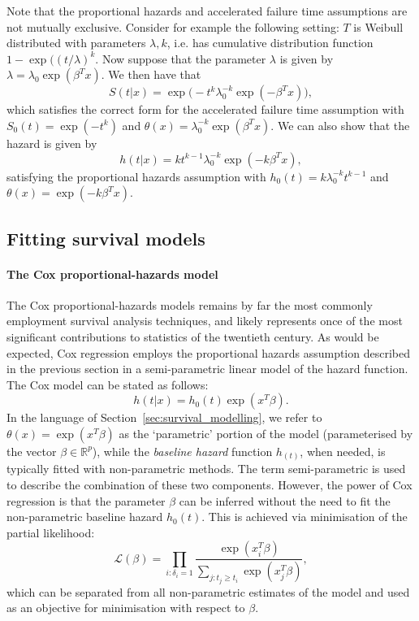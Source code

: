\documentclass[../thesis.tex]{subfiles}
\begin{document}
Note that the proportional hazards and accelerated failure time assumptions are not mutually exclusive. Consider for example the following setting: $T$ is Weibull distributed with parameters $\lambda, k$, i.e. has cumulative distribution function $1- \exp((t/\lambda)^k$. Now suppose that the parameter $\lambda$ is given by $\lambda = \lambda_0 \exp(\beta^T x)$. We then have that 
\[S(t|x) = \exp\big(-t^k\lambda_0^{-k}\exp( -\beta^Tx)\big), \]
which satisfies the correct form for the accelerated failure time assumption with $S_0(t) = \exp(-t^k)$ and $\theta(x) = \lambda_0^{-k}\exp(\beta^Tx)$. We can also show that the hazard is given by 
\[h(t|x) = kt^{k-1}\lambda_0^{-k} \exp(-k\beta^Tx), \]
satisfying the proportional hazards assumption with $h_0(t) = k\lambda_0^{-k}t^{k-1}$ and $\theta(x) = \exp(-k\beta^Tx)$. 



\subsection{Fitting survival models}

\paragraph{The Cox proportional-hazards model}
The Cox proportional-hazards models \citep{cox_regression_1972} remains by far the most commonly employment survival analysis techniques, and likely represents once of the most significant contributions to statistics of the twentieth century. As would be expected, Cox regression employs the proportional hazards assumption described in the previous section in a semi-parametric linear model of the hazard function. The Cox model can be stated as follows:
\[h(t|x) = h_0(t) \exp(x^T\beta). \]
In the language of Section~\ref{sec:survival_modelling}, we refer to $\theta(x) = \exp(x^T\beta)$ as the `parametric' portion of the model (parameterised by the vector $\beta \in \mathbb{R}^p$), while the \emph{baseline hazard} function $h_(t)$, when needed, is typically fitted with non-parametric methods. The term semi-parametric is used to describe the combination of these two components. However, the power of Cox regression is that the parameter $\beta$ can be inferred without the need to fit the non-parametric baseline hazard $h_0(t)$. This is achieved via minimisation of the partial likelihood:
\[\mathcal{L}(\beta) = \prod_{i:\delta_i=1} \frac{\exp(x_i^T\beta)}{\sum_{j: t_j \geq t_i}\exp(x_j^T\beta)},\]
which can be separated from all non-parametric estimates of the model and used as an objective for minimisation with respect to $\beta$.
\end{document}
